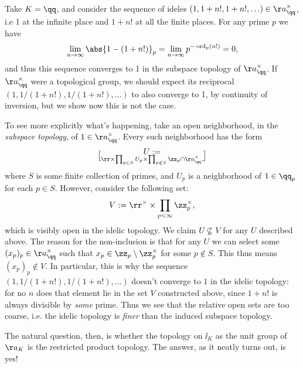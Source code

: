 \documentclass[11pt, x11names, openany]{book}
\begin{document}
\begin{example}
    \label{example: subspace neq idelic topology}
    Take $K = \qq$, and consider the sequence of ideles $(1, 1 + n!, 1 + n!, \ldots) \in \aa_\qq^\times$, i.e 1 at the infinite place and $1 + n!$ at all the finite places. For any prime $p$ we have
    \begin{equation*}
        \lim_{n \to \infty}  \abs{1 - (1 + n!)}_p = \lim_{n \to \infty} p^{- \ord_p(n!)} = 0,
    \end{equation*}
    and thus this sequence converges to 1 in the subspace topology of $\aa_\qq^\times$. If $\aa_\qq^\times$ were a topological group, we should expect its reciprocal $(1, 1/(1 + n!), 1/(1 + n!), \ldots)$ to also converge to 1, by continuity of inversion, but we show now this is not the case.

    To see more explicitly what's happening, take an open neighborhood, in the \textit{subspace topology}, of $1 \in \aa_\qq^\times$. Every such neighborhood has the form
    \begin{equation*}
        U := \brack{\rr \times \prod_{p \in S}U_p \times \prod_{p \notin S}\zz_p} \cap \aa_\qq^\times,
    \end{equation*}
    where $S$ is some finite collection of primes, and $U_p$ is a neighborhood of $1 \in \qq_p$ for each $p \in S$. However, consider the following set:
    \begin{equation*}
        V := \rr^\times \times \prod_{p < \infty} \zz_p^\times,
    \end{equation*}
    which is visibly open in the idelic topology. We claim $U \nsubseteq V$ for any $U$ described above. The reason for the non-inclusion is that for any $U$ we can select some $(x_p)_p \in \aa_\qq^\times$ such that $x_p \in \zz_p \setminus \zz_p^\times$ for some $p \notin S$. This thus means $(x_p)_p \notin V$. In particular, this is why the sequence $(1, 1/(1+n!), 1/(1+n!), \ldots)$ doesn't converge to $1$ in the idelic topology: for no $n$ does that element lie in the set $V$ constructed above, since $1+n!$ is always divisible by \textit{some} prime. Thus we see that the relative open sets are too coarse, i.e. the idelic topology is \textit{finer} than the induced subspace topology. 
\end{example}
    
The natural question, then, is whether the topology on $\ii_K$ as the unit group of $\aa_K$ is the restricted product topology. The answer, as it neatly turns out, is yes!
\end{document}

